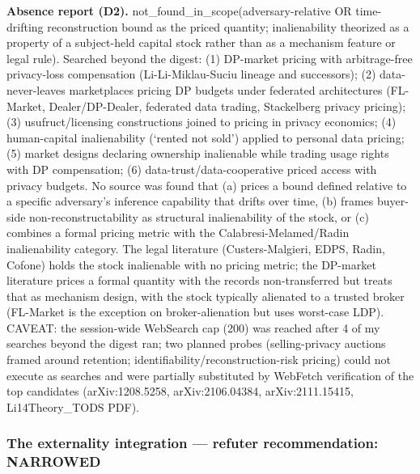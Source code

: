 \documentclass[
  11pt,
]{article}
\begin{document}
\textbf{Absence report (D2).} not\_found\_in\_scope(adversary-relative
OR time-drifting reconstruction bound as the priced quantity;
inalienability theorized as a property of a subject-held capital stock
rather than as a mechanism feature or legal rule). Searched beyond the
digest: (1) DP-market pricing with arbitrage-free privacy-loss
compensation (Li-Li-Miklau-Suciu lineage and successors); (2)
data-never-leaves marketplaces pricing DP budgets under federated
architectures (FL-Market, Dealer/DP-Dealer, federated data trading,
Stackelberg privacy pricing); (3) usufruct/licensing constructions
joined to pricing in privacy economics; (4) human-capital inalienability
(`rented not sold') applied to personal data pricing; (5) market designs
declaring ownership inalienable while trading usage rights with DP
compensation; (6) data-trust/data-cooperative priced access with privacy
budgets. No source was found that (a) prices a bound defined relative to
a specific adversary's inference capability that drifts over time, (b)
frames buyer-side non-reconstructability as structural inalienability of
the stock, or (c) combines a formal pricing metric with the
Calabresi-Melamed/Radin inalienability category. The legal literature
(Custers-Malgieri, EDPS, Radin, Cofone) holds the stock inalienable with
no pricing metric; the DP-market literature prices a formal quantity
with the records non-transferred but treats that as mechanism design,
with the stock typically alienated to a trusted broker (FL-Market is the
exception on broker-alienation but uses worst-case LDP). CAVEAT: the
session-wide WebSearch cap (200) was reached after 4 of my searches
beyond the digest ran; two planned probes (selling-privacy auctions
framed around retention; identifiability/reconstruction-risk pricing)
could not execute as searches and were partially substituted by WebFetch
verification of the top candidates (arXiv:1208.5258, arXiv:2106.04384,
arXiv:2111.15415, Li14Theory\_TODS PDF).

\subsubsection{The externality integration --- refuter recommendation:
NARROWED}\label{the-externality-integration-refuter-recommendation-narrowed}
\end{document}
